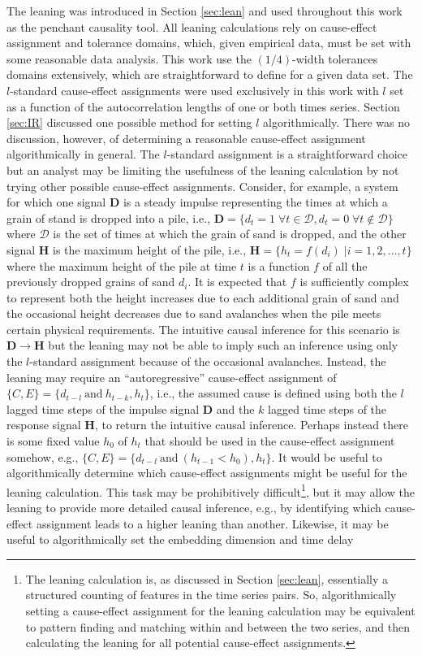 The leaning was introduced in Section \ref{sec:lean} and used throughout this work as the penchant causality tool.  All leaning calculations rely on cause-effect assignment and tolerance domains, which, given empirical data, must be set with some reasonable data analysis.  This work use the $(1/4)$-width tolerances domains extensively, which are straightforward to define for a given data set.  The $l$-standard cause-effect assignments were used exclusively in this work with $l$ set as a function of the autocorrelation lengths of one or both times series.  Section \ref{sec:IR} discussed one possible method for setting $l$ algorithmically.  There was no discussion, however, of determining a reasonable cause-effect assignment algorithmically in general.  The $l$-standard assignment is a straightforward choice but an analyst may be limiting the usefulness of the leaning calculation by not trying other possible cause-effect assignments.  Consider, for example, a system for which one signal $\mathbf{D}$ is a steady impulse representing the times at which a grain of stand is dropped into a pile, i.e., $\mathbf{D} = \{d_t = 1\; \forall t\in\mathcal{D}, d_t = 0\; \forall t\not\in\mathcal{D}\}$ where $\mathcal{D}$ is the set of times at which the grain of sand is dropped, and the other signal $\mathbf{H}$ is the maximum height of the pile, i.e., $\mathbf{H} = \{h_t = f(d_i)\; |i=1,2,\ldots,t\}$ where the maximum height of the pile at time $t$ is a function $f$ of all the previously dropped grains of sand $d_i$.  It is expected that $f$ is sufficiently complex to represent both the height increases due to each additional grain of sand and the occasional height decreases due to sand avalanches when the pile meets certain physical requirements.  The intuitive causal inference for this scenario is $\mathbf{D}\rightarrow\mathbf{H}$ but the leaning may not be able to imply such an inference using only the $l$-standard assignment because of the occasional avalanches.  Instead, the leaning may require an ``autoregressive'' cause-effect assignment of $\{C,E\} = \{d_{t-l}\mathrm{\ and\ }h_{t-k},h_t\}$, i.e., the assumed cause is defined using both the $l$ lagged time steps of the impulse signal $\mathbf{D}$ and the $k$ lagged time steps of the response signal $\mathbf{H}$, to return the intuitive causal inference.  Perhaps instead there is some fixed value $h_0$ of $h_t$ that should be used in the cause-effect assignment somehow, e.g., $\{C,E\} = \{d_{t-l}\mathrm{\ and\ }(h_{t-1}<h_0),h_t\}$.  It would be useful to algorithmically determine which cause-effect assignments might be useful for the leaning calculation.  This task may be prohibitively difficult\footnote{The leaning calculation is, as discussed in Section \ref{sec:lean}, essentially a structured counting of features in the time series pairs.  So, algorithmically setting a cause-effect assignment for the leaning calculation may be equivalent to pattern finding and matching within and between the two series, and then calculating the leaning for all potential cause-effect assignments.}, but it may allow the leaning to provide more detailed causal inference, e.g., by identifying which cause-effect assignment leads to a higher leaning than another.  Likewise, it may be useful to algorithmically set the embedding dimension and time delay 